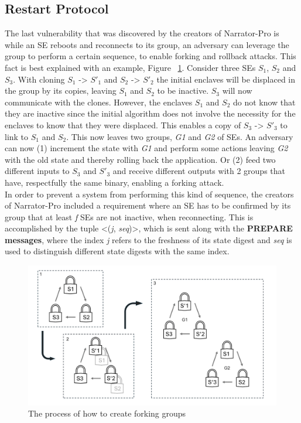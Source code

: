 \subsection{Restart Protocol}
The last vulnerability that was discovered by the creators of Narrator-Pro is while an SE reboots and reconnects to its group, an adversary can leverage the group to perform a certain sequence, to enable forking and rollback attacks. This fact is best explained with an example, Figure  ~\ref{fig:2}. Consider three SEs \(S_{1}\), \(S_{2}\) and \(S_{3}\). With cloning \(S_{1}\) -> \(S'_{1}\) and \(S_{2}\) -> \(S'_{2}\) the initial enclaves will be displaced in the group by its copies, leaving \(S_{1}\) and \(S_{2}\) to be inactive. \(S_{3}\) will now communicate with the clones. However, the enclaves \(S_{1}\) and \(S_{2}\) do not know that they are inactive since the initial algorithm does not involve the necessity for the enclaves to know that they were displaced. This enables a copy of \(S_{3}\) -> \(S'_{3}\) to link to \(S_{1}\) and \(S_{2}\). This now leaves two groups, \textit{G1} and \textit{G2} of SEs. An adversary can now (1) increment the state with \textit{G1} and perform some actions leaving \textit{G2} with the old state and thereby rolling back the application. Or (2) feed two different inputs to \(S_{3}\) and \(S'_{3}\) and receive different outputs with 2 groups that have, respectfully the same binary, enabling a forking attack.\\
In order to prevent a system from performing this kind of sequence, the creators of Narrator-Pro included a requirement where an SE has to be confirmed by its group that at least \textit{f} SEs are not inactive, when reconnecting. This is accomplished by the tuple <(\textit{j}, \textit{seq})>, which is sent along with the \textbf{PREPARE messages}, where the index \textit{j} refers to the freshness of its state digest and \textit{seq} is used to distinguish different state digests with the same index.\\


\begin{figure}[h]
    \centering
    \includegraphics[width=\linewidth]{Figures/Figure2.png}
    \caption{The process of how to create forking groups}
    \label{fig:2}
\end{figure}